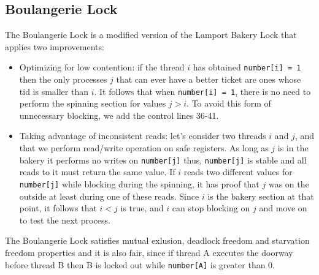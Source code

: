 \subsection{Boulangerie Lock}
The Boulangerie Lock \cite{MOSES201846} is a modified version of the Lamport Bakery Lock that applies two improvements:
\begin{itemize}
	\item Optimizing for low contention: if the thread $i$ has obtained \texttt{number[i] = 1} then the only processes $j$ that can ever have a better ticket are ones whose tid is smaller than $i$. It follows that when \texttt{number[i] = 1}, there is no need to perform the spinning section for values $j > i$. To avoid this form of unnecessary blocking, we add the control lines 36-41.

	\item Taking advantage of inconsistent reads: let's consider two threads $i$ and $j$, and that we perform read/write operation on safe registers. As long as $j$ is in the bakery it performs no writes on \texttt{number[j]} thus, \texttt{number[j]} is stable and all reads to it must return the same value. If $i$ reads two different values for \texttt{number[j]} while blocking during the spinning, it has proof that $j$ was on the outside at least during one of these reads. Since $i$ is the bakery section at that point, it follows that $i < j$ is true, and $i$ can stop blocking on $j$ and move on to test the next process.
\end{itemize}

The Boulangerie Lock satisfies mutual exlusion, deadlock freedom and starvation freedom properties and it is also fair, since if thread A executes the doorway before thread B then B is locked out while \texttt{number[A]} is greater than 0.


